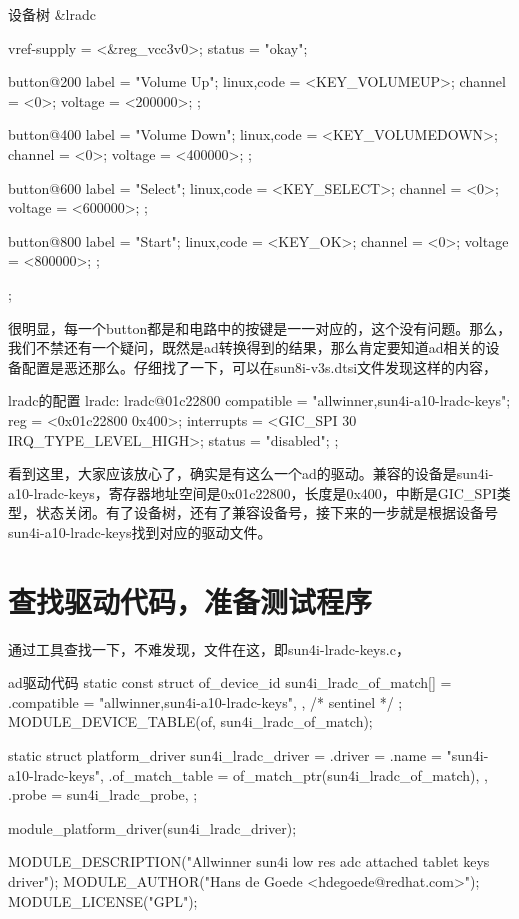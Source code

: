 \documentclass[lang=cn,newtx,10pt,scheme=chinese]{elegantbook}
\begin{document}
\begin{mycode}{设备树}
&lradc {
    vref-supply = <&reg_vcc3v0>;
    status = "okay";
 
    button@200 {
        label = "Volume Up";
        linux,code = <KEY_VOLUMEUP>;
        channel = <0>;
        voltage = <200000>;
    };
 
    button@400 {
        label = "Volume Down";
        linux,code = <KEY_VOLUMEDOWN>;
        channel = <0>;
        voltage = <400000>;
    };
 
    button@600 {
        label = "Select";
        linux,code = <KEY_SELECT>;
        channel = <0>;
        voltage = <600000>;
    };
 
    button@800 {
        label = "Start";
        linux,code = <KEY_OK>;
        channel = <0>;
        voltage = <800000>;
    };
};
\end{mycode}

很明显，每一个button都是和电路中的按键是一一对应的，这个没有问题。那么，我们不禁还有一个疑问，既然是ad转换得到的结果，那么肯定要知道ad相关的设备配置是恶还那么。仔细找了一下，可以在sun8i-v3s.dtsi文件发现这样的内容，

\begin{mycode}{lradc的配置}
lradc: lradc@01c22800 {
    compatible = "allwinner,sun4i-a10-lradc-keys";
    reg = <0x01c22800 0x400>;
    interrupts = <GIC_SPI 30 IRQ_TYPE_LEVEL_HIGH>;
    status = "disabled";
};
\end{mycode}

看到这里，大家应该放心了，确实是有这么一个ad的驱动。兼容的设备是sun4i-a10-lradc-keys，寄存器地址空间是0x01c22800，长度是0x400，中断是GIC\_SPI类型，状态关闭。有了设备树，还有了兼容设备号，接下来的一步就是根据设备号sun4i-a10-lradc-keys找到对应的驱动文件。

\section{查找驱动代码，准备测试程序}

通过工具查找一下，不难发现，文件在这，即sun4i-lradc-keys.c，

\begin{mycode}{ad驱动代码}
static const struct of_device_id sun4i_lradc_of_match[] = {
    { .compatible = "allwinner,sun4i-a10-lradc-keys", },
    { /* sentinel */ }
};
MODULE_DEVICE_TABLE(of, sun4i_lradc_of_match);

static struct platform_driver sun4i_lradc_driver = {
    .driver = {
        .name    = "sun4i-a10-lradc-keys",
        .of_match_table = of_match_ptr(sun4i_lradc_of_match),
    },
    .probe    = sun4i_lradc_probe,
};

module_platform_driver(sun4i_lradc_driver);

MODULE_DESCRIPTION("Allwinner sun4i low res adc attached tablet keys driver");
MODULE_AUTHOR("Hans de Goede <hdegoede@redhat.com>");
MODULE_LICENSE("GPL");    
\end{mycode}
\end{document}
